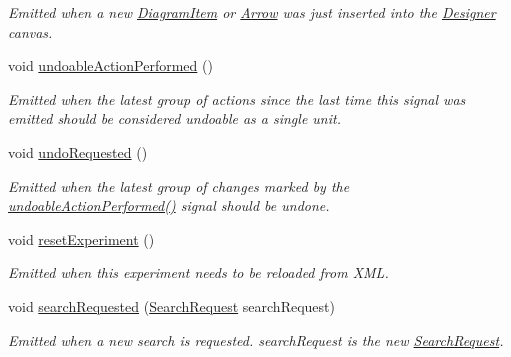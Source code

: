 \begin{DoxyCompactItemize}
\begin{DoxyCompactList}\small\item\em Emitted when a new \hyperlink{class_diagram_item}{Diagram\-Item} or \hyperlink{class_arrow}{Arrow} was just inserted into the \hyperlink{class_designer}{Designer} canvas. \end{DoxyCompactList}\item 
\hypertarget{class_editor_state_a3246c06c7cf7caba24c8eb2597ec5780}{void \hyperlink{class_editor_state_a3246c06c7cf7caba24c8eb2597ec5780}{undoable\-Action\-Performed} ()}\label{class_editor_state_a3246c06c7cf7caba24c8eb2597ec5780}

\begin{DoxyCompactList}\small\item\em Emitted when the latest group of actions since the last time this signal was emitted should be considered undoable as a single unit. \end{DoxyCompactList}\item 
\hypertarget{class_editor_state_adb17c7032933e39f0dfa602ff9c28813}{void \hyperlink{class_editor_state_adb17c7032933e39f0dfa602ff9c28813}{undo\-Requested} ()}\label{class_editor_state_adb17c7032933e39f0dfa602ff9c28813}

\begin{DoxyCompactList}\small\item\em Emitted when the latest group of changes marked by the \hyperlink{class_editor_state_a3246c06c7cf7caba24c8eb2597ec5780}{undoable\-Action\-Performed()} signal should be undone. \end{DoxyCompactList}\item 
void \hyperlink{class_editor_state_abaea4e2e0cc7b68712ffed0a537f6577}{reset\-Experiment} ()
\begin{DoxyCompactList}\small\item\em Emitted when this experiment needs to be reloaded from X\-M\-L. \end{DoxyCompactList}\item 
void \hyperlink{class_editor_state_adfc61d63511d2f06084a13d58e746fae}{search\-Requested} (\hyperlink{struct_search_request}{Search\-Request} search\-Request)
\begin{DoxyCompactList}\small\item\em Emitted when a new search is requested. search\-Request is the new \hyperlink{struct_search_request}{Search\-Request}. \end{DoxyCompactList}\end{DoxyCompactItemize}

